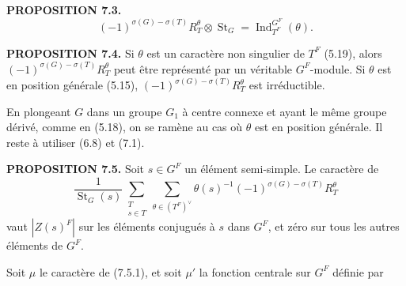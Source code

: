 \documentclass[9pt,twoside]{extarticle}
\begin{document}
{\noindent\textbf{PROPOSITION 7.3.} \[
(-1)^{\sigma(G)-\sigma(T)}R_T^\theta\otimes\operatorname{St}_G
=\operatorname{Ind}_{T^F}^{G^F}(\theta).
\]\par

\noindent\textbf{PROPOSITION 7.4.} Si \(\theta\) est un caractère non singulier de \(T^F\) (5.19), alors \((-1)^{\sigma(G)-\sigma(T)}R_T^\theta\) peut être représenté par un véritable \(G^F\)-module. Si \(\theta\) est en position générale (5.15), \((-1)^{\sigma(G)-\sigma(T)}R_T^\theta\) est irréductible.\par

En plongeant \(G\) dans un groupe \(G_1\) à centre connexe et ayant le même groupe dérivé, comme en (5.18), on se ramène au cas où \(\theta\) est en position générale. Il reste à utiliser (6.8) et (7.1).\par

\noindent\textbf{PROPOSITION 7.5.} Soit \(s\in G^F\) un élément semi-simple. Le caractère de \[
\tag{7.5.1}
\frac1{\operatorname{St}_G(s)}
\sum_{\substack{T\\s\in T}}
\sum_{\theta\in(T^F)^\vee}
\theta(s)^{-1}(-1)^{\sigma(G)-\sigma(T)}R_T^\theta
\] vaut \(|Z(s)^F|\) sur les éléments conjugués à \(s\) dans \(G^F\), et zéro sur tous les autres éléments de \(G^F\).\par

Soit \(\mu\) le caractère de (7.5.1), et soit \(\mu'\) la fonction centrale sur \(G^F\) définie par\par
}
\end{document}
